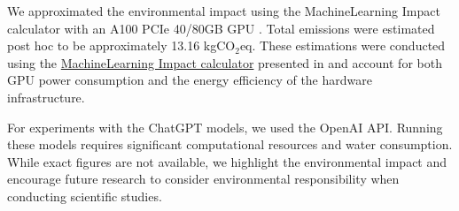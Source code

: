We approximated the environmental impact using the MachineLearning Impact calculator with an A100 PCIe 40/80GB GPU \cite{lacoste2019quantifying}. Total emissions were estimated post hoc to be approximately 13.16 kgCO$_2$eq. These estimations were conducted using the \href{https://mlco2.github.io/impact#compute}{MachineLearning Impact calculator} presented in \cite{lacoste2019quantifying} and account for both GPU power consumption and the energy efficiency of the hardware infrastructure.

For experiments with the ChatGPT models, we used the OpenAI API. Running these models requires significant computational resources and water consumption. While exact figures are not available, we highlight the environmental impact and encourage future research to consider environmental responsibility when conducting scientific studies.
